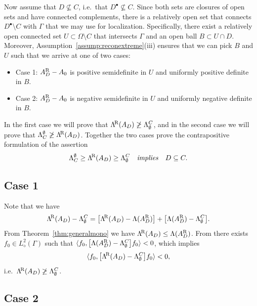 \documentclass[reqno]{amsart}
\numberwithin{equation}{section}
\numberwithin{figure}{section}
\numberwithin{table}{section}
\theoremstyle{plain}
\theoremstyle{definition}
\theoremstyle{remark}
\newcommand{\inner}[1]{\langle#1\rangle}
\newcommand{\upR}{^{\textup{R}}}
\newcommand{\uptR}{^{\!\textup{R}}}
\newcommand{\LambdaR}{\Lambda\uptR}
\newcommand{\AR}{A\upR}
\begin{document}
	Now assume that $D \not\subseteq C$, i.e.~that $D^\bullet\not\subseteq C$. Since both sets are closures of open sets and have connected complements, there is a relatively open set that connects $D^\bullet\setminus C$ with $\Gamma$ that we may use for localization. Specifically, there exist a relatively open connected set $U\subset \Omega\setminus C$ that intersects $\Gamma$ and an open ball $B\subset U \cap D$. Moreover, Assumption~\ref{assump:reconextreme}(iii) ensures that we can pick $B$ and $U$ such that we arrive at one of two cases:
	\begin{itemize}
		\item Case 1: $\AR_D - A_0$ is positive semidefinite in $U$ and uniformly positive definite in $B$.
		\item Case 2: $\AR_D - A_0$ is negative semidefinite in $U$ and uniformly negative definite in $B$.
	\end{itemize}
	In the first case we will prove that $\LambdaR(A_D) \not\geq \Lambda_\emptyset^C$, and in the second case we will prove that $\Lambda_C^\emptyset \not\geq \LambdaR(A_D)$. Together the two cases prove the contrapositive formulation of the assertion 
	\begin{equation*}
		\Lambda_C^{\emptyset} \geq \LambdaR(A_D) \geq \Lambda_{\emptyset}^C \quad \text{\emph{implies}} \quad D \subseteq C.
	\end{equation*}
	
	\subsection*{Case 1}
	
	Note that we have
	\begin{equation*}
		\LambdaR(A_D) - \Lambda_\emptyset^C = \bigl[\LambdaR(A_D) - \Lambda(\AR_D)\bigr] + \bigl[\Lambda(\AR_D) - \Lambda_\emptyset^C\bigr].
	\end{equation*}
	From Theorem~\ref{thm:generalmono} we have $\LambdaR(A_D) \leq \Lambda(\AR_D)$. From \cite[case 2 in proof of theorem~12.2]{GJZ2025} there exists $f_0\in L_\diamond^2(\Gamma)$ such that $\inner{f_0,\bigl[\Lambda(\AR_D) - \Lambda_\emptyset^C\bigr]f_0} < 0$, which implies
	\begin{equation*}
		\inner{f_0,\bigl[\LambdaR(A_D) - \Lambda_\emptyset^C\bigr]f_0} < 0,
	\end{equation*}
	i.e.~$\LambdaR(A_D) \not\geq \Lambda_\emptyset^C$.
	
	\subsection*{Case 2}
	
\end{document}
